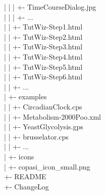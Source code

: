 \documentclass[12pt]{book}
\begin{document}
{\begin{tabbing}
 \> | \> \> | \> \> | \> +- TimeCourseDialog.jpg \\
 \> | \> \> | \> \> | \> +- ... \\
 \> | \> \> | \> \> +- TutWiz-Step1.html \\
 \> | \> \> | \> \> +- TutWiz-Step2.html \\
 \> | \> \> | \> \> +- TutWiz-Step3.html \\
 \> | \> \> | \> \> +- TutWiz-Step4.html \\
 \> | \> \> | \> \> +- TutWiz-Step5.html \\
 \> | \> \> | \> \> +- TutWiz-Step6.html \\
 \> | \> \> | \> \> +- ... \\
 \> | \> \> +- examples \\
 \> | \> \> | \> +- CircadianClock.cps \\
 \> | \> \> | \> +- Metabolism-2000Poo.xml \\
 \> | \> \> | \> +- YeastGlycolysis.gps \\
 \> | \> \> | \> +- brusselator.cps \\
 \> | \> \> | \> +- ... \\
 \> | \> \> +- icons \\
 \> | \> \> \> +- copasi\_icon\_small.png \\
 \> +- README \\
 \> +- ChangeLog \\
\end{tabbing}
}
\end{document}
